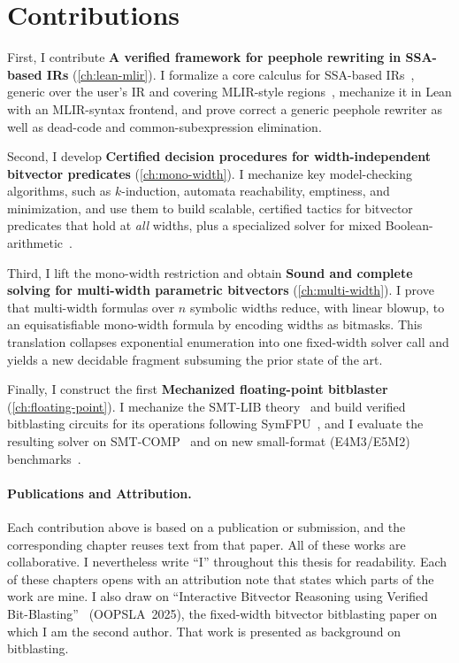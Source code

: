\section{Contributions}

\noindent First, I contribute \textbf{A verified framework for peephole rewriting in SSA-based IRs} (\cref{ch:lean-mlir}).
I formalize a core calculus for SSA-based IRs~\citep{appel1998ssa,rastello2022ssa},
generic over the user's IR and covering MLIR-style regions~\citep{lattner2021mlir}, mechanize it in
Lean with an MLIR-syntax frontend, and prove correct a generic peephole
rewriter as well as dead-code and common-subexpression elimination.

\noindent Second, I develop \textbf{Certified decision procedures for width-independent bitvector predicates} (\cref{ch:mono-width}).
I mechanize key model-checking algorithms, such as $k$-induction, automata reachability, emptiness, and
minimization, and use them to build scalable, certified tactics for
bitvector predicates that hold at \emph{all} widths, plus a specialized
solver for mixed Boolean-arithmetic~\citep{liu2021mba,reichenwallner2022efficient}.

\noindent Third, I lift the mono-width restriction and obtain \textbf{Sound and complete solving for multi-width parametric bitvectors} (\cref{ch:multi-width}).
I prove that multi-width formulas over $n$ symbolic widths reduce, with linear blowup, to an equisatisfiable mono-width formula by encoding widths as bitmasks.
This translation collapses exponential enumeration into one fixed-width solver call and yields a new decidable fragment subsuming the prior state of the art.

\noindent Finally, I construct the first \textbf{Mechanized floating-point bitblaster} (\cref{ch:floating-point}).
I mechanize the SMT-LIB \qffp{} theory~\citep{extrealsemantics} and build verified bitblasting circuits for its operations
following SymFPU~\citep{symfpu}, and I evaluate the resulting solver on SMT-COMP~\citep{smtcomp2024} and on new
small-format (E4M3/E5M2) benchmarks~\citep{fp8fordl}.

\paragraph{Publications and Attribution.}
Each contribution above is based on a publication or submission,
and the corresponding chapter reuses text from that paper.
All of these works are collaborative.
I nevertheless write ``I'' throughout this thesis for readability.
Each of these chapters opens with an attribution note that states which parts of the work are mine.
I also draw on ``Interactive Bitvector Reasoning using Verified Bit-Blasting''~\citep{leanbv} (OOPSLA~2025),
the fixed-width bitvector bitblasting paper on which I am the second author.
That work is presented as background on bitblasting.

